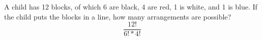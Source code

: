 \item A child has 12 blocks, of which 6 are black, 4 are red, 1 is white, and 1 is blue. If the child puts the blocks in a line, how many arrangements are possible?
\[ \frac{12!}{6!*4!} \]